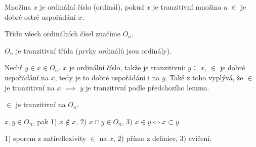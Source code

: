 \documentclass[12pt]{article}                   %
\begin{document}
    \begin{definice}[Ordinál]
        Množina $x$ je ordinální číslo (ordinál), pokud $x$ je tranzitivní množina a $\in$ je dobré ostré uspořádání $x$.
        
        Třídu všech ordinálních čísel značíme $O_n$.
    \end{definice}

    \begin{lemma}
        $O_n$ je tranzitivní třída (prvky ordinálů jsou ordinály).

        \begin{dukazin}
            Nechť $y \in x \in O_n$. $x$ je ordinální číslo, takže je tranzitivní: $y \subseteq x$, $\in$ je dobré uspořádání na $x$, tedy je to dobré uspořádání i na $y$. Také z toho vyplývá, že $\in$ je tranzitivní na $x$ $\implies$ $y$ je tranzitivní podle předchozího lemma.
        \end{dukazin}
    \end{lemma}

    \begin{dusledek}
        $\in$ je tranzitivní na $O_n$.
    \end{dusledek}

    \begin{lemma}
        $x, y \in O_n$, pak 1) $x \notin x$, 2) $x \cap y \in O_n$, 3) $x \in y \Leftrightarrow x \subset y$.

        \begin{dukazin}
                1) sporem z antireflexivity $\in$ na $x$, 2) přímo z definice, 3) cvičení.
        \end{dukazin}
    \end{lemma}

    \begin{definice}
    \end{definice}
\end{document}
